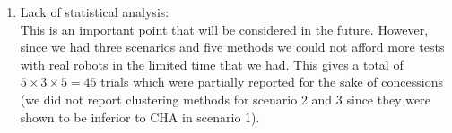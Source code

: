 \documentclass[a4paper]{article}
\begin{document}
\begin{enumerate}
  
  
  
  \item Lack of statistical analysis:\\ This is an important point that will be considered in the future. However, since we had three scenarios and five methods we could not afford more tests with real robots in the limited time that we had. This gives a total of $5\times 3\times 5 = 45$ trials which were partially reported for the sake of concessions (we did not report clustering methods for scenario 2 and 3 since they were shown to be inferior to CHA in scenario 1).
  
\end{enumerate}
\end{document}
